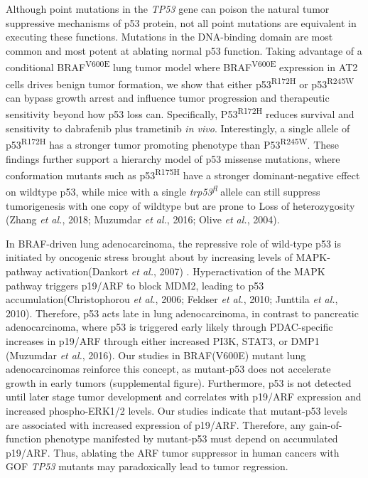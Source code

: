 Although point mutations in the \emph{TP53} gene can poison the natural tumor suppressive mechanisms of p53 protein, not all point mutations are equivalent in executing these functions. Mutations in the DNA-binding domain are most common and most potent at ablating normal p53 function. Taking advantage of a conditional BRAF\textsuperscript{V600E} lung tumor model where BRAF\textsuperscript{V600E} expression in AT2 cells drives benign tumor formation, we show that either p53\textsuperscript{R172H} or p53\textsuperscript{R245W} can bypass growth arrest and influence tumor progression and therapeutic sensitivity beyond how p53 loss can. Specifically, P53\textsuperscript{R172H} reduces survival and sensitivity to dabrafenib plus trametinib \emph{in vivo}. Interestingly, a single allele of p53\textsuperscript{R172H} has a stronger tumor promoting phenotype than P53\textsuperscript{R245W}. These findings further support a hierarchy model of p53 missense mutations, where conformation mutants such as p53\textsuperscript{R175H} have a stronger dominant-negative effect on wildtype p53, while mice with a single \emph{trp53\textsuperscript{fl}} allele can still suppress tumorigenesis with one copy of wildtype but are prone to Loss of heterozygosity (Zhang \emph{et al.}, 2018; Muzumdar \emph{et al.}, 2016; Olive \emph{et al.}, 2004).

In BRAF-driven lung adenocarcinoma, the repressive role of wild-type p53 is initiated by oncogenic stress brought about by increasing levels of MAPK-pathway activation(Dankort \emph{et al.}, 2007) . Hyperactivation of the MAPK pathway triggers p19/ARF to block MDM2, leading to p53 accumulation(Christophorou \emph{et al.}, 2006; Feldser \emph{et al.}, 2010; Junttila \emph{et al.}, 2010). Therefore, p53 acts late in lung adenocarcinoma, in contrast to pancreatic adenocarcinoma, where p53 is triggered early likely through PDAC-specific increases in p19/ARF through either increased PI3K, STAT3, or DMP1 (Muzumdar \emph{et al.}, 2016). Our studies in BRAF(V600E) mutant lung adenocarcinomas reinforce this concept, as mutant-p53 does not accelerate growth in early tumors (supplemental figure). Furthermore, p53 is not detected until later stage tumor development and correlates with p19/ARF expression and increased phospho-ERK1/2 levels. Our studies indicate that mutant-p53 levels are associated with increased expression of p19/ARF. Therefore, any gain-of-function phenotype manifested by mutant-p53 must depend on accumulated p19/ARF. Thus, ablating the ARF tumor suppressor in human cancers with GOF \emph{TP53} mutants may paradoxically lead to tumor regression.

